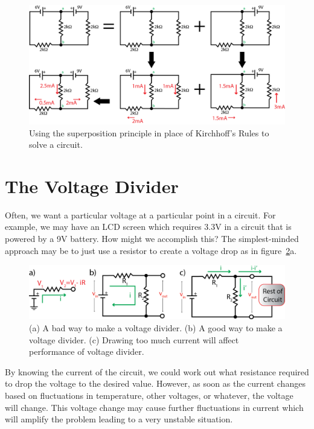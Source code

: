 \documentclass{tufte-book}
\begin{document}
\begin{figure}[h]
\caption{Using the superposition principle in place of Kirchhoff's Rules to solve a circuit.}
\label{fig:superposition_circuits}
\begin{center}
\includegraphics[width=\textwidth]{superposition_circuits}
\end{center}
\end{figure}


\section{The Voltage Divider}
Often, we want a particular voltage at a particular point in a circuit. For example, we may have an LCD screen which requires 3.3V in a circuit that is powered by a 9V battery. How might we accomplish this? The simplest-minded approach may be to just use a resistor to create a voltage drop as in figure~\ref{fig:voltagedivider}a. 


\begin{figure}[h]
\caption{(a) A bad way to make a voltage divider. (b) A good way to make a voltage divider. (c) Drawing too much current will affect performance of voltage divider.}
\label{fig:voltagedivider}
\begin{center}
\includegraphics[width=\textwidth]{voltage_divider}
\end{center}
\end{figure}


By knowing the current of the circuit, we could work out what resistance required to drop the voltage to the desired value. However, as soon as the current changes based on fluctuations in temperature, other voltages, or whatever, the voltage will change. This voltage change may cause further fluctuations in current which will amplify the problem leading to a very unstable situation. 
\end{document}
